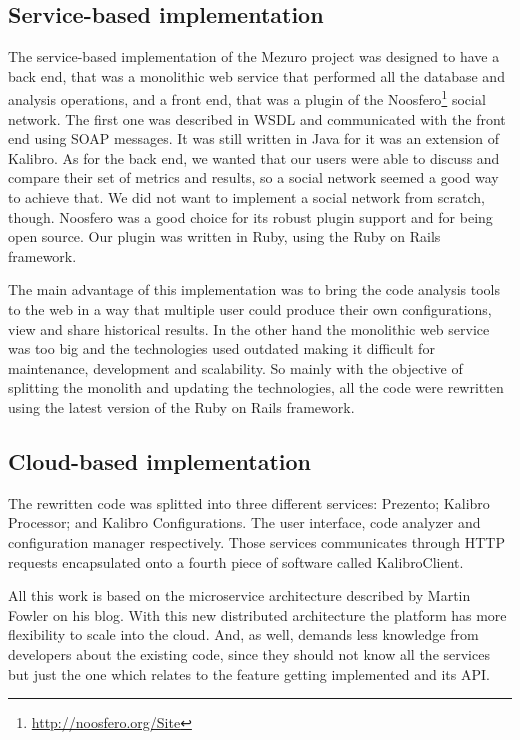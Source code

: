 \subsection{Service-based implementation}
\label{subsec:service-based-implementation}

The service-based implementation of the Mezuro project was designed to have a back end, that was a monolithic web service that performed all the database and analysis operations, and a front end, that was a plugin of the Noosfero\footnote{\url{http://noosfero.org/Site}} social network. The first one was described in WSDL and communicated with the front end using SOAP messages. It was still written in Java for it was an extension of Kalibro. As for the back end, we wanted that our users were able to discuss and compare their set of metrics and results, so a social network seemed a good way to achieve that. We did not want to implement a social network from scratch, though. Noosfero was a good choice for its robust plugin support and for being open source. Our plugin was written in Ruby, using the Ruby on Rails framework.

The main advantage of this implementation was to bring the code analysis tools to the web in a way that multiple user could produce their own configurations, view and share historical results. In the other hand the monolithic web service was too big and the technologies used outdated making it difficult for maintenance, development and scalability. So mainly with the objective of splitting the monolith and updating the technologies, all the code were rewritten using the latest version of the Ruby on Rails framework.

\subsection{Cloud-based implementation}
\label{subsec:cloud-based-implementation}

The rewritten code was splitted into three different services: Prezento; Kalibro Processor; and Kalibro Configurations. The user interface, code analyzer and configuration manager respectively. Those services communicates through HTTP requests encapsulated onto a fourth piece of software called KalibroClient.

All this work is based on the microservice architecture described by Martin Fowler on his blog. With this new distributed architecture the platform has more flexibility to scale into the cloud. And, as well, demands less knowledge from developers about the existing code, since they should not know all the services but just the one which relates to the feature getting implemented and its API.
